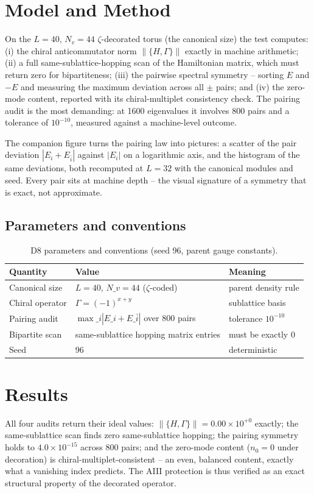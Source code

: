 \documentclass[11pt,a4paper]{article}
\begin{document}
\section{Model and Method}
On the $L = 40$, $N_v = 44$ $\zeta$-decorated torus (the canonical size) the test computes: (i) the chiral anticommutator norm $\|\{H, \Gamma\}\|$ exactly in machine arithmetic; (ii) a full same-sublattice-hopping scan of the Hamiltonian matrix, which must return zero for bipartiteness; (iii) the pairwise spectral symmetry -- sorting $E$ and $-E$ and measuring the maximum deviation across all $\pm$ pairs; and (iv) the zero-mode content, reported with its chiral-multiplet consistency check. The pairing audit is the most demanding: at 1600 eigenvalues it involves 800 pairs and a tolerance of $10^{-10}$, measured against a machine-level outcome.

The companion figure turns the pairing law into pictures: a scatter of the pair deviation $|E_i + E_{\bar i}|$ against $|E_i|$ on a logarithmic axis, and the histogram of the same deviations, both recomputed at $L = 32$ with the canonical modules and seed. Every pair sits at machine depth -- the visual signature of a symmetry that is exact, not approximate.

\subsection{Parameters and conventions}
\begin{table}[htbp]\centering\small
\begin{tabularx}{\columnwidth}{@{}l l X@{}}
\toprule
Quantity & Value & Meaning \\
\midrule
Canonical size & $L = 40$, $N\_v = 44$ ($\zeta$-coded) & parent density rule \\
Chiral operator & $\Gamma = (-1)^{x+y}$ & sublattice basis \\
Pairing audit & $\max\_i |E\_i + E\_{\bar i}|$ over 800 pairs & tolerance $10^{-10}$ \\
Bipartite scan & same-sublattice hopping matrix entries & must be exactly 0 \\
Seed & 96 & deterministic \\
\bottomrule
\end{tabularx}
\caption{D8 parameters and conventions (seed 96, parent gauge constants).}
\end{table}

\section{Results}
All four audits return their ideal values: $\|\{H, \Gamma\}\| = 0.00\times10^{+0}$ exactly; the same-sublattice scan finds zero same-sublattice hopping; the pairing symmetry holds to $4.0\times10^{-15}$ across 800 pairs; and the zero-mode content ($n_0 = 0$ under decoration) is chiral-multiplet-consistent -- an even, balanced content, exactly what a vanishing index predicts. The AIII protection is thus verified as an exact structural property of the decorated operator.
\end{document}
